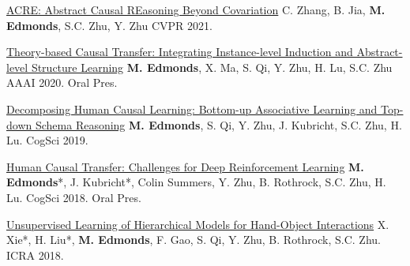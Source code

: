 


\begin{cvpublications}

\item \cvpublication
{\href{https://mjedmonds.com/papers/cvpr21zhang_acre.pdf}{ACRE: Abstract Causal REasoning Beyond Covariation}} %
{C. Zhang, B. Jia, \textbf{M. Edmonds}, S.C. Zhu, Y. Zhu} %
{CVPR 2021.} %
{} %

\item \cvpublication
{\href{https://mjedmonds.com/papers/AAAI20_OpenLockLearnerTransferRL_final.pdf}{Theory-based Causal Transfer: Integrating Instance-level Induction and Abstract-level Structure Learning}} %
{\textbf{M. Edmonds}, X. Ma, S. Qi, Y. Zhu, H. Lu, S.C. Zhu} %
{AAAI 2020.} %
{Oral Pres.} %

 \item \cvpublication
{\href{http://www.mjedmonds.com/papers/CogSci19_OpenLockLearner_final.pdf}{Decomposing Human Causal Learning: Bottom-up Associative Learning and Top-down Schema Reasoning}} %
{\textbf{M. Edmonds}, S. Qi, Y. Zhu,  J. Kubricht, S.C. Zhu, H. Lu.} %
{CogSci 2019.} %
{} %

\item \cvpublication
{\href{http://www.mjedmonds.com/papers/CogSci18_OpenLock_CausalRL_final.pdf}{Human Causal Transfer: Challenges for Deep Reinforcement Learning}} %
{\textbf{M. Edmonds}*, J. Kubricht*, Colin Summers, Y. Zhu, B. Rothrock, S.C. Zhu, H. Lu.} %
{CogSci 2018.} %
{Oral Pres.} %

\item \cvpublication
{\href{http://www.mjedmonds.com/papers/ICRA18_Unsupervised_learning_hierarchical_hoi.pdf}{Unsupervised Learning of Hierarchical Models for Hand-Object Interactions}} %
{X. Xie*, H. Liu*, \textbf{M. Edmonds}, F. Gao, S. Qi, Y. Zhu, B. Rothrock, S.C. Zhu.} %
{ICRA 2018.} %
{} %


\end{cvpublications}
